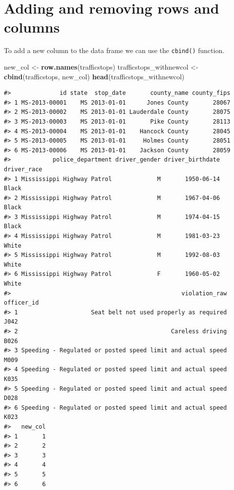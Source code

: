 \documentclass[]{book}
\newenvironment{Shaded}{\begin{snugshade}}{\end{snugshade}}
\newcommand{\KeywordTok}[1]{\textcolor[rgb]{0.13,0.29,0.53}{\textbf{#1}}}
\newcommand{\StringTok}[1]{\textcolor[rgb]{0.31,0.60,0.02}{#1}}
\newcommand{\NormalTok}[1]{#1}
\theoremstyle{definition}
\theoremstyle{definition}
\theoremstyle{definition}
\theoremstyle{remark}
\begin{document}
\section{Adding and removing rows and
columns}\label{adding-and-removing-rows-and-columns}

To add a new column to the data frame we can use the \texttt{cbind()}
function.

\begin{Shaded}
\begin{Highlighting}[]
\NormalTok{new_col <-}\StringTok{ }\KeywordTok{row.names}\NormalTok{(trafficstops)}
\NormalTok{trafficstops_withnewcol <-}\StringTok{ }\KeywordTok{cbind}\NormalTok{(trafficstops, new_col)}
\KeywordTok{head}\NormalTok{(trafficstops_withnewcol)}
\end{Highlighting}
\end{Shaded}

\begin{verbatim}
#>              id state  stop_date       county_name county_fips
#> 1 MS-2013-00001    MS 2013-01-01      Jones County       28067
#> 2 MS-2013-00002    MS 2013-01-01 Lauderdale County       28075
#> 3 MS-2013-00003    MS 2013-01-01       Pike County       28113
#> 4 MS-2013-00004    MS 2013-01-01    Hancock County       28045
#> 5 MS-2013-00005    MS 2013-01-01     Holmes County       28051
#> 6 MS-2013-00006    MS 2013-01-01    Jackson County       28059
#>            police_department driver_gender driver_birthdate driver_race
#> 1 Mississippi Highway Patrol             M       1950-06-14       Black
#> 2 Mississippi Highway Patrol             M       1967-04-06       Black
#> 3 Mississippi Highway Patrol             M       1974-04-15       Black
#> 4 Mississippi Highway Patrol             M       1981-03-23       White
#> 5 Mississippi Highway Patrol             M       1992-08-03       White
#> 6 Mississippi Highway Patrol             F       1960-05-02       White
#>                                                 violation_raw officer_id
#> 1                     Seat belt not used properly as required       J042
#> 2                                            Careless driving       B026
#> 3 Speeding - Regulated or posted speed limit and actual speed       M009
#> 4 Speeding - Regulated or posted speed limit and actual speed       K035
#> 5 Speeding - Regulated or posted speed limit and actual speed       D028
#> 6 Speeding - Regulated or posted speed limit and actual speed       K023
#>   new_col
#> 1       1
#> 2       2
#> 3       3
#> 4       4
#> 5       5
#> 6       6
\end{verbatim}
\end{document}
